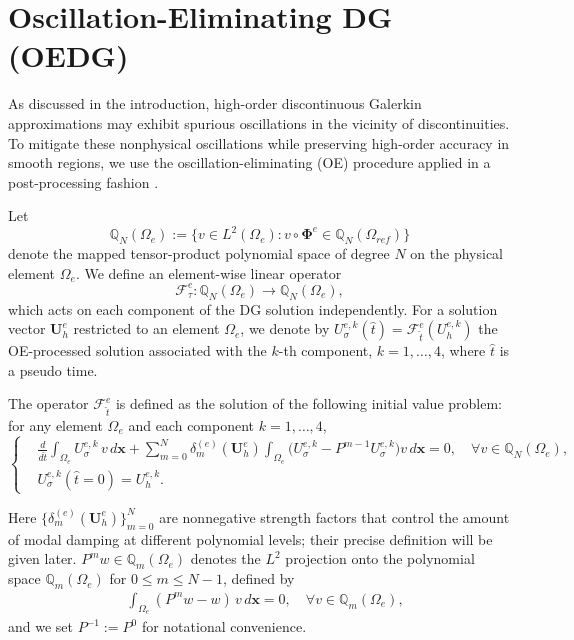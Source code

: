 \documentclass[fleqn,11pt]{amsart}
\begin{document}
\section{Oscillation-Eliminating DG (OEDG)}
\label{sec:oedg}

As discussed in the introduction, high-order discontinuous Galerkin
approximations may exhibit spurious oscillations in the vicinity of
discontinuities. To mitigate these nonphysical oscillations while
preserving high-order accuracy in smooth regions, we use the oscillation-eliminating (OE) procedure applied in a post-processing fashion \cite{peng2025oedg}.

Let 
$$\mathbb Q_N(\Omega_{e}) := \{v\in L^2(\Omega_e): v\circ \bm \Phi^e \in \mathbb Q_N(\Omega_{ref}) \} $$ denote the mapped tensor-product
polynomial space of degree $N$ on the physical element $\Omega_e$.
We define an element-wise linear operator
\[
\mathcal F_\tau^e : \mathbb Q_N(\Omega_e)
\longrightarrow \mathbb Q_N(\Omega_e),
\]
which acts on each component of the DG solution independently.
For a solution vector $\bm U_h^e$ restricted to an element
$\Omega_e$, we denote by
$U_{\sigma}^{e,k}(\hat t) = \mathcal F_{\hat t}^e(U_h^{e,k})$
the OE-processed solution associated with the $k$-th component,
$k = 1,\dots,4$, where $\hat t$ is a pseudo time.

The operator $\mathcal F_{\hat t}^e$ is defined as the solution of the
following initial value problem: for any element $\Omega_e$ and each
component $k=1,\dots,4$,
\begin{equation}
\label{eq:oe_ode}
\left\{
\begin{aligned}
&\frac{d}{d\hat t}
\int_{\Omega_e} U_{\sigma}^{e,k} \, v \, d\bm x
+ \sum_{m=0}^{N}
\delta_m^{(e)}(\bm U_h^e)
\int_{\Omega_e}
\bigl(
U_{\sigma}^{e,k} - P^{m-1} U_{\sigma}^{e,k}
\bigr) v \, d\bm x
= 0,
\quad \forall v \in \mathbb Q_N(\Omega_e), \\
& U_{\sigma}^{e,k}(\hat t = 0) = U_h^{e,k}.
\end{aligned}
\right.
\end{equation}

Here $\{\delta_m^{(e)}(\bm U_h^e)\}_{m=0}^N$ are nonnegative
strength factors that control the amount of modal damping at different
polynomial levels; their precise definition will be given later.
$P^m w\in \mathbb Q_m(\Omega_e)$ denotes the $L^2$ projection onto the polynomial
space $\mathbb Q_m(\Omega_e)$ for $0 \le m \le N-1$, defined by
\begin{equation}
\label{eq:oe_projection}
\begin{aligned}
&\int_{\Omega_e} (P^m w - w)\, v \, d\bm x = 0,
\quad \forall v \in \mathbb Q_m(\Omega_e),
\end{aligned}
\end{equation}
and we set $P^{-1} := P^0$ for notational convenience.
\end{document}
